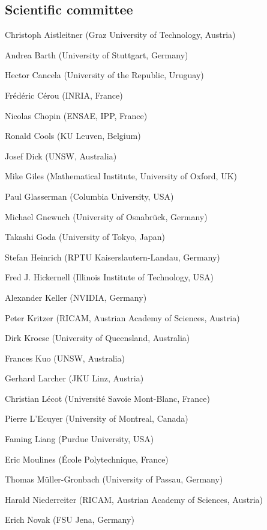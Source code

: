 \clearpage

\subsection{Scientific committee}



\setlength{\columnsep}{1cm}
\begin{multicols}{2}
\raggedright
Christoph Aistleitner (Graz University of Technology, Austria)

Andrea Barth (University of Stuttgart, Germany)

Hector Cancela (University of the Republic, Uruguay)

Frédéric Cérou (INRIA, France)

Nicolas Chopin (ENSAE, IPP, France)

Ronald Cools (KU Leuven, Belgium)

Josef Dick (UNSW, Australia)

Mike Giles (Mathematical Institute, University of Oxford, UK)

Paul Glasserman (Columbia University, USA)

Michael Gnewuch (University of Osnabrück, Germany)

Takashi Goda (University of Tokyo, Japan)

Stefan Heinrich (RPTU Kaiserslautern-Landau, Germany)

Fred J. Hickernell (Illinois Institute of Technology, USA)

Alexander Keller (NVIDIA, Germany)

Peter Kritzer (RICAM, Austrian Academy of Sciences, Austria)

Dirk Kroese (University of Queensland, Australia)

Frances Kuo (UNSW, Australia)

Gerhard Larcher (JKU Linz, Austria)

Christian Lécot (Université Savoie Mont-Blanc, France)

Pierre L'Ecuyer (University of Montreal, Canada)

Faming Liang (Purdue University, USA)

Eric Moulines (\'{E}cole Polytechnique, France)

Thomas Müller-Gronbach (University of Passau, Germany)

Harald Niederreiter (RICAM, Austrian Academy of Sciences, Austria)

Erich Novak (FSU Jena, Germany)


\end{multicols}
